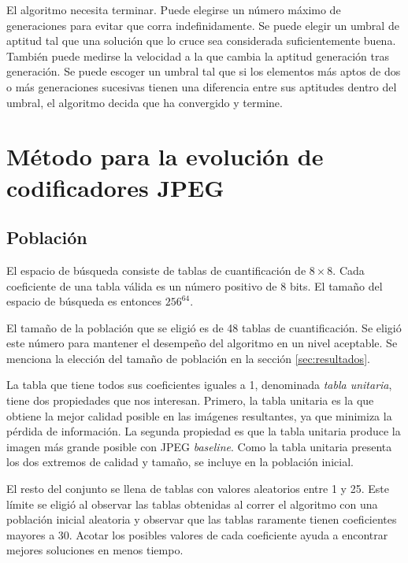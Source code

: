 El algoritmo necesita terminar. Puede elegirse un número máximo de generaciones
para evitar que corra indefinidamente. Se puede elegir un umbral de aptitud tal
que una solución que lo cruce sea considerada suficientemente buena.
También puede medirse la velocidad a la que cambia la aptitud generación tras
generación. Se puede escoger un umbral tal que si los elementos más aptos de
dos o más generaciones sucesivas tienen una diferencia entre sus aptitudes
dentro del umbral, el algoritmo decida que ha convergido y termine.

\section{Método para la evolución de codificadores JPEG} \label{sec:GA}

\subsection{Población}

El espacio de búsqueda consiste de tablas de cuantificación de $8\times8$. Cada
coeficiente de una tabla válida es un número positivo de 8 bits. El tamaño del
espacio de búsqueda es entonces $256^{64}$.

El tamaño de la población que se eligió es de 48 tablas de cuantificación. Se
eligió este número para mantener el desempeño del algoritmo en un nivel
aceptable. Se menciona la elección del tamaño de población en la sección \ref{sec:resultados}.

La tabla que tiene todos sus coeficientes iguales a 1, denominada
\emph{\gls{tabla unitaria}}, tiene dos propiedades que nos interesan. Primero,
la tabla unitaria es la que obtiene la mejor calidad posible en las imágenes
resultantes, ya que minimiza la pérdida de información. La segunda propiedad es
que la tabla unitaria produce la imagen más grande posible con JPEG
\emph{baseline}. Como la tabla unitaria presenta los dos extremos de calidad y
tamaño, se incluye en la población inicial.

El resto del conjunto se llena de tablas con valores aleatorios entre 1 y 25.
Este límite se eligió al observar las tablas obtenidas al correr el algoritmo
con una población inicial aleatoria y observar que las tablas raramente tienen
coeficientes mayores a 30. Acotar los posibles valores de cada coeficiente
ayuda a encontrar mejores soluciones en menos tiempo.

